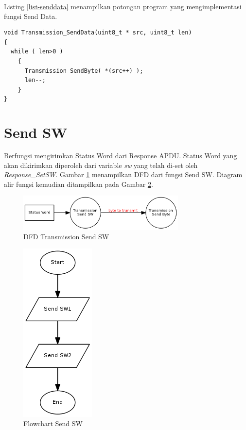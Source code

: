 Listing \ref{list-senddata} menampilkan potongan program yang mengimplementasi fungsi Send Data.

\begin{lstlisting}[caption={Listing program fungsi Send Data}, label={list-senddata}]
void Transmission_SendData(uint8_t * src, uint8_t len)
{
  while ( len>0 )
    {
      Transmission_SendByte( *(src++) );
      len--;
    }
}
\end{lstlisting}

\section{Send SW}
\label{sec_sendsw}

Berfungsi mengirimkan Status Word dari Response APDU. Status Word yang akan dikirimkan diperoleh dari variable \emph{sw} yang telah di-set oleh \emph{Response\_SetSW}. Gambar \ref{fig-dfd-sendsw} menampilkan DFD dari fungsi Send SW. Diagram alir fungsi kemudian ditampilkan pada Gambar \ref{fig-flow-sendsw}.

\begin{figure}[!h]
\centering
\includegraphics[width=0.75\textwidth]{image/transmission/dfd_sendsw.png}
\caption{DFD Transmission Send SW}
\label{fig-dfd-sendsw}
\end{figure}

\begin{figure}[!h]
\centering
\includegraphics[height=0.3\textheight]{image/transmission/flow_sendsw.png}
\caption{Flowchart Send SW}
\label{fig-flow-sendsw}
\end{figure}

